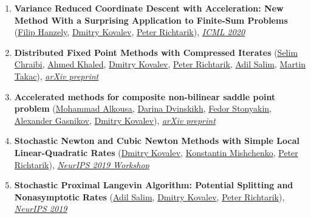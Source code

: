 \begin{enumerate}
\item \textbf{Variance Reduced Coordinate Descent with Acceleration: New Method With a Surprising Application to Finite-Sum Problems} (\href{https://fhanzely.github.io/index.html}{\color{linkcolour}Filip Hanzely}, \href{https://www.dmitry-kovalev.com}{\color{linkcolour}Dmitry Kovalev}, \href{https://richtarik.org}{\color{linkcolour}Peter Richtarik}), \href{http://proceedings.mlr.press/v119/hanzely20b.html}{\em \color{black}ICML 2020}
\item \textbf{Distributed Fixed Point Methods with Compressed Iterates} (\href{https://scholar.google.com/citations?user=gyiubRkAAAAJ}{\color{linkcolour}Selim Chraibi}, \href{https://rka97.github.io}{\color{linkcolour}Ahmed Khaled}, \href{https://www.dmitry-kovalev.com}{\color{linkcolour}Dmitry Kovalev}, \href{https://richtarik.org}{\color{linkcolour}Peter Richtarik}, \href{https://adil-salim.github.io}{\color{linkcolour}Adil Salim}, \href{https://mtakac.com}{\color{linkcolour}Martin Takac}), \href{https://arxiv.org/abs/1912.09925}{\em \color{black}arXiv preprint}
\item \textbf{Accelerated methods for composite non-bilinear saddle point problem} (\href{https://scholar.google.com/citations?user=dJgWojUAAAAJ}{\color{linkcolour}Mohammad Alkousa}, \href{https://scholar.google.com/citations?user=5ILnTRsAAAAJ}{\color{linkcolour}Darina Dvinskikh}, \href{https://www.researchgate.net/profile/Fedor_Stonyakin}{\color{linkcolour}Fedor Stonyakin}, \href{https://scholar.google.ru/citations?user=AmeE8qkAAAAJ}{\color{linkcolour}Alexander Gasnikov}, \href{https://www.dmitry-kovalev.com}{\color{linkcolour}Dmitry Kovalev}), \href{https://arxiv.org/abs/1906.03620}{\em \color{black}arXiv preprint}
\item \textbf{Stochastic Newton and Cubic Newton Methods with Simple Local Linear-Quadratic Rates} (\href{https://www.dmitry-kovalev.com}{\color{linkcolour}Dmitry Kovalev}, \href{https://konstmish.github.io}{\color{linkcolour}Konstantin Mishchenko}, \href{https://richtarik.org}{\color{linkcolour}Peter Richtarik}), \href{https://sites.google.com/site/optneurips19/}{\em \color{black}NeurIPS 2019 Workshop}
\item \textbf{Stochastic Proximal Langevin Algorithm: Potential Splitting and Nonasymptotic Rates} (\href{https://adil-salim.github.io}{\color{linkcolour}Adil Salim}, \href{https://www.dmitry-kovalev.com}{\color{linkcolour}Dmitry Kovalev}, \href{https://richtarik.org}{\color{linkcolour}Peter Richtarik}), \href{https://papers.nips.cc/paper/8891-stochastic-proximal-langevin-algorithm-potential-splitting-and-nonasymptotic-rates}{\em \color{black}NeurIPS 2019}

\end{enumerate}
